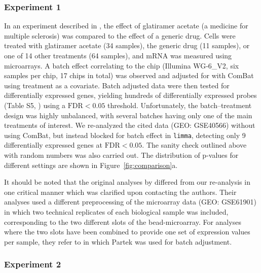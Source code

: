 \documentclass{bio}
\begin{document}
\subsubsection{Experiment 1}

In an experiment described in \citet{Towfic2014}, the effect of glatiramer acetate (a medicine for multiple sclerosis) was compared to the effect of a generic drug. Cells were treated with glatiramer acetate (34 samples), the generic drug (11 samples), or one of 14 other treatments (64 samples), and mRNA was measured using microarrays. A batch effect correlating to the chip (Illumina WG-6\_V2, six samples per chip, 17 chips in total) was observed and adjusted for with ComBat using treatment as a covariate. Batch adjusted data were then tested for differentially expressed genes, yielding hundreds of differentially expressed probes (Table S5, \citealp{Towfic2014}) using a $\text{FDR}<0.05$ threshold. Unfortunately, the batch--treatment design was highly unbalanced, with several batches having only one of the main treatments of interest. We re-analyzed the cited data (GEO: GSE40566) without using ComBat, but instead blocked for batch effect in \texttt{limma}, detecting only 9 differentially expressed genes at $\text{FDR}<0.05$. The sanity check  outlined above with random numbers was also carried out. The distribution of p-values for different settings are shown in Figure~\ref{fig:comparison}a.

It should be noted that the original analyses by \citet{Towfic2014} differed from our re-analysis in one critical manner which was clarified upon contacting the authors. Their analyses used a different preprocessing of the microarray data (GEO: GSE61901) in which two technical replicates of each biological sample was included, corresponding to the two different slots of the bead-microarray. For analyses where the two slots have been combined to provide one set of expression values per sample, they refer to \citet{Bakshi2013} in which Partek was used for batch adjustment.

\subsubsection{Experiment 2}
\end{document}
